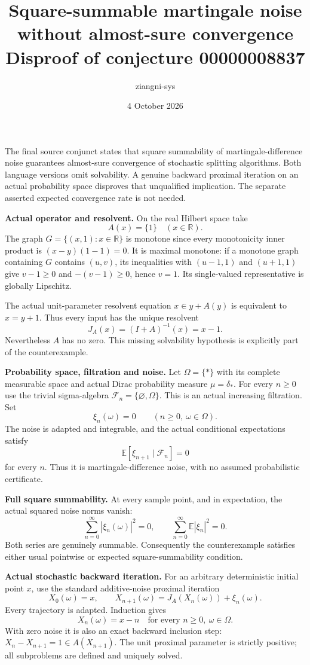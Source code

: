 \documentclass[11pt,a4paper]{article}
\title{Square-summable martingale noise without almost-sure convergence\\
\large Disproof of conjecture 00000008837}
\author{ziangni-sys}
\date{4 October 2026}
\begin{document}
\maketitle
The final source conjunct states that square summability of
martingale-difference noise guarantees almost-sure convergence
of stochastic splitting algorithms. Both language versions omit
solvability. A genuine backward proximal iteration on an actual
probability space disproves that unqualified implication.
The separate asserted expected convergence rate is not needed.

\textbf{Actual operator and resolvent.}
On the real Hilbert space take
\[
 A(x)=\{1\}\quad(x\in\mathbb R).
\]
The graph $G=\{(x,1):x\in\mathbb R\}$ is monotone since every
monotonicity inner product is $(x-y)(1-1)=0$.
It is maximal monotone: if a monotone graph containing $G$
contains $(u,v)$, its inequalities with $(u-1,1)$ and $(u+1,1)$
give $v-1\geq0$ and $-(v-1)\geq0$, hence $v=1$.
Its single-valued representative is globally Lipschitz.

The actual unit-parameter resolvent equation
$x\in y+A(y)$ is equivalent to $x=y+1$.
Thus every input has the unique resolvent
\[
 J_A(x)=(I+A)^{-1}(x)=x-1.
\]
Nevertheless $A$ has no zero. This missing solvability hypothesis
is explicitly part of the counterexample.

\textbf{Probability space, filtration and noise.}
Let $\Omega=\{\ast\}$ with its complete measurable space and
actual Dirac probability measure $\mu=\delta_\ast$.
For every $n\geq0$ use the trivial sigma-algebra
$\mathcal F_n=\{\varnothing,\Omega\}$.
This is an actual increasing filtration.
Set
\[
 \xi_n(\omega)=0\qquad(n\geq0,\ \omega\in\Omega).
\]
The noise is adapted and integrable, and the actual conditional
expectations satisfy
\[
 \mathbb E[\xi_{n+1}\mid\mathcal F_n]=0
\]
for every $n$. Thus it is martingale-difference noise, with no
assumed probabilistic certificate.

\newpage
\textbf{Full square summability.}
At every sample point, and in expectation, the actual squared
noise norms vanish:
\[
 \sum_{n=0}^{\infty}|\xi_n(\omega)|^2=0,\qquad
 \sum_{n=0}^{\infty}\mathbb E|\xi_n|^2=0.
\]
Both series are genuinely summable.
Consequently the counterexample satisfies either usual
pointwise or expected square-summability condition.

\textbf{Actual stochastic backward iteration.}
For an arbitrary deterministic initial point $x$, use the
standard additive-noise proximal iteration
\[
 X_0(\omega)=x,\qquad
 X_{n+1}(\omega)=J_A(X_n(\omega))+\xi_n(\omega).
\]
Every trajectory is adapted. Induction gives
\[
 X_n(\omega)=x-n
 \quad\text{for every }n\geq0,\ \omega\in\Omega.
\]
With zero noise it is also an exact backward inclusion step:
$X_n-X_{n+1}=1\in A(X_{n+1})$.
The unit proximal parameter is strictly positive; all
subproblems are defined and uniquely solved.
\end{document}
